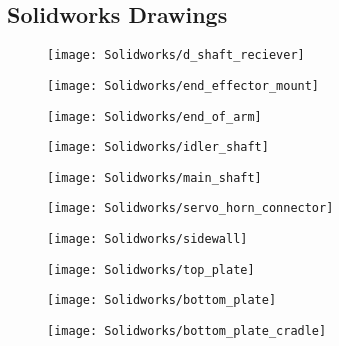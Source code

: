 \begin{flushleft}
\section{Solidworks Drawings}
\end{flushleft}
\label{app:SolidworksDrawings}
\begin{figure}[H]
	\centering
	\texttt{[image: Solidworks/d\_shaft\_reciever]}
	\caption{}
	\label{fig:d_shaft_receiver}
\end{figure}
\begin{figure}[H]
\centering
\texttt{[image: Solidworks/end\_effector\_mount]}
\caption{}
\label{fig:end_effector_mount}
\end{figure}
\begin{figure}[H]
\centering
\texttt{[image: Solidworks/end\_of\_arm]}
\caption{}
\label{fig:end_of_arm}
\end{figure}
\begin{figure}[H]
\centering
\texttt{[image: Solidworks/idler\_shaft]}
\caption{}
\label{fig:idler_shaft}
\end{figure}
\begin{figure}[H]
\centering
\texttt{[image: Solidworks/main\_shaft]}
\caption{}
\label{fig:main_shaft}
\end{figure}
\begin{figure}[H]
\centering
\texttt{[image: Solidworks/servo\_horn\_connector]}
\caption{}
\label{fig:servo_horn_connector}
\end{figure}
\begin{figure}[H]
\centering
\texttt{[image: Solidworks/sidewall]}
\caption{}
\label{fig:sidewall}
\end{figure}
\begin{figure}[H]
\centering
\texttt{[image: Solidworks/top\_plate]}
\caption{}
\label{fig:top_plate}
\end{figure}
\begin{figure}[H]
\centering
\texttt{[image: Solidworks/bottom\_plate]}
\caption{}
\label{fig:bottom_plate}
\end{figure}
\begin{figure}[H]
\centering
\texttt{[image: Solidworks/bottom\_plate\_cradle]}
\caption{}
\label{fig:bottom_plate_cradle}
\end{figure}



